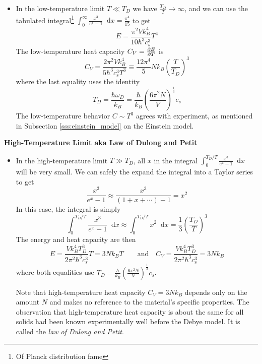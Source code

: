 \documentclass[11pt, a4paper]{article}
\newcommand{\diff}{\mathop{}\!\mathrm{d}} %
\begin{document}
\begin{itemize}
	\item In the low-temperature limit $ T \ll T_{D} $ we have $ \frac{T_{D}}{T} \to \infty $, and we can use the tabulated integral\footnote{Of Planck distribution fame} $ \int_{0}^{\infty}\frac{x^{3}}{e^{x}-1}\diff x = \frac{\pi^{4}}{15}$ to get
	\begin{equation*}
		E = \frac{\pi^{2}Vk_{B}^{4}}{10 \hbar^{3} c_{s}^{3}}T^{4}
	\end{equation*}
	The low-temperature heat capacity $ C_{V} = \pdv{E}{T} $  is
	\begin{equation*}
		C_{V} = \frac{2\pi^{2}Vk_{B}^{4}}{5\hbar^{3} c_{s}^{3}T^{3}} \equiv \frac{12\pi^{4}}{5}Nk_{B}\left(\frac{T}{T_{D}}\right)^{3}
	\end{equation*}
	where the last equality uses the identity
	\begin{equation*}
		T_{D} = \frac{\hbar \omega_{D}}{k_{B}} = \frac{\hbar}{k_{B}} \left(\frac{6\pi^{2}N}{V}\right)^{\frac{1}{3}}c_{s}
	\end{equation*}
	The low-temperature behavior $ C \sim T^{3} $ agrees with experiment, as mentioned in Subsection \ref{sss:einstein_model} on the Einstein model.
\end{itemize}

\textbf{High-Temperature Limit aka Law of Dulong and Petit}
\begin{itemize}	
	\item In the high-temperature limit $ T \gg T_{D} $, all $ x $ in the integral $  \int_{0}^{T_{D}/T}\frac{x^{3}}{e^{x}-1}\diff x  $ will be very small. We can safely the expand the integral into a Taylor series to get
	\begin{equation*}
		\frac{x^{3}}{e^{x} - 1} \approx \frac{x^{3}}{(1 + x + \cdots )-1} = x^{2}
	\end{equation*}
	In this case, the integral is simply
	\begin{equation*}
		 \int_{0}^{T_{D}/T}\frac{x^{3}}{e^{x}-1}\diff x  \approx \int_{0}^{T_{D}/T} x^{2}\diff x  = \frac{1}{3}\left(\frac{T_{D}}{T}\right)^{3}
	\end{equation*}
	The energy and heat capacity are then 
	\begin{equation*}
		E = \frac{Vk_{B}^{4}T_{D}^{3}}{2\pi^{2}\hbar^{3}c_{s}^{3}}T = 3Nk_{B}T \qquad \text{and}\quad C_{V} = \frac{V k_{B}^{4}T_{D}^{3}}{2\pi^{2}\hbar^{3}c_{s}^{3}} = 3 N k_{B}
	\end{equation*}
	where both equalities use $ T_{D} = \frac{\hbar}{k_{B}} \left(\frac{6\pi^{2}N}{V}\right)^{\frac{1}{3}}c_{s} $.
	
	Note that high-temperature heat capacity $ C_{V} = 3Nk_{B} $ depends only on the amount $ N $ and makes no reference to the material's specific properties. The observation that high-temperature heat capacity is about the same for all solids had been known experimentally well before the Debye model. It is called the \textit{law of Dulong and Petit}. 
	
\end{itemize}
\end{document}
